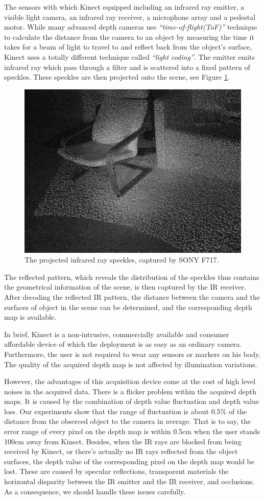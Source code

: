 The sensors with which Kinect equipped including an infrared ray emitter, a visible light camera, an infrared ray receiver, a microphone array and a pedestal motor. While many advanced depth cameras use \emph{``time-of-flight(ToF)''} technique to calculate the distance from the camera to an object by measuring the time it takes for a beam of light to travel to and reflect back from the object's surface, Kinect uses a totally different technique called \emph{``light coding''}. The emitter emits infrared ray which pass through a filter and is scattered into a fixed pattern of speckles. These speckles are then projected onto the scene, see Figure \ref{f:irspeckles}.
\begin{figure}
\centering
\includegraphics[width=0.5\linewidth]{./figure/irspeckles.jpg}
\caption{The projected infrared ray speckles, captured by SONY F717.}
\label{f:irspeckles}
\end{figure}
The reflected pattern, which reveals the distribution of the speckles thus contains the geometrical information of the scene, is then captured by the IR receiver. After decoding the reflected IR pattern, the distance between the camera and the surfaces of object in the scene can be determined, and the corresponding depth map is available.

In brief, Kinect is a non-intrusive, commercially available and consumer affordable device of which the deployment is as easy as an ordinary camera. Furthermore, the user is not required to wear any sensors or markers on his body. The quality of the acquired depth map is not affected by illumination variations.

However, the advantages of this acquisition device come at the cost of high level noises in the acquired data. There is a flicker problem within the acquired depth maps. It is caused by the combination of depth value fluctuation and depth value loss. Our experiments show that the range of fluctuation is about 0.5\% of the distance from the obserced object to the camera in average. That is to say, the error range of every pixel on the depth map is within 0.5cm when the user stands 100cm away from Kinect. Besides, when the IR rays are blocked from being received by Kinect, or there's actually no IR rays reflected from the object surfaces, the depth value of the corresponding pixel on the depth map would be lost. These are caused by specular reflections, transparent materials the horizontal disparity between the IR emitter and the IR receiver, and occlusions. As a consequence, we should handle these issues carefully.

